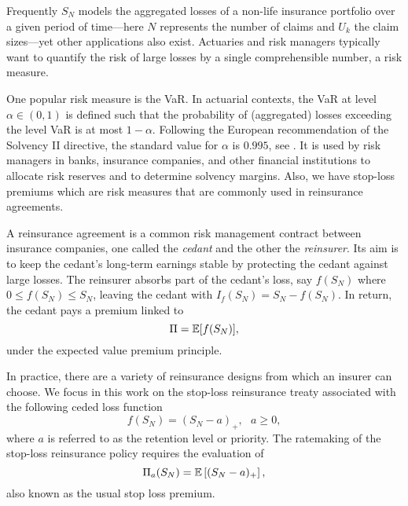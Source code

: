 Frequently $S_N$ models the aggregated losses of a non-life insurance portfolio over a given period of time---here $N$ represents the number of claims and $U_k$ the claim sizes---yet other applications also exist. Actuaries and risk managers typically want to quantify the risk of large losses by a single comprehensible number, a risk measure.

One popular risk measure is the VaR. In actuarial contexts, the VaR at level $\alpha \in (0,1)$ is defined such that the probability of (aggregated) losses exceeding the level VaR is at most $1-\alpha$.
Following the European recommendation of the Solvency II directive, the standard value for $\alpha$ is $0.995$, see \cite{EIOPA}. It is used by risk managers in banks, insurance companies, and other financial institutions to allocate risk reserves and to determine solvency margins. Also, we have stop-loss premiums which are risk measures that are commonly used in reinsurance agreements.


A reinsurance agreement is a common risk management contract between insurance companies, one called the \emph{cedant} and the other the \emph{reinsurer}. Its aim is to keep the cedant's long-term earnings stable by protecting the cedant against large losses. The reinsurer absorbs part of the cedant's loss, say $f(S_N)$ where $0\leq f(S_N)\leq S_N$, leaving the cedant with $I_{f}(S_N)=S_N-f(S_N)$. In return, the cedant pays a premium linked to
\begin{equation*}\label{eq:DefinitionReinsurancePremium}
\Pi=\operatorname{{\mathbb E}}[f(S_N)],
\end{equation*}
under the expected value premium principle.


In practice, there are a variety of reinsurance designs from which an insurer can choose. We focus in this work on the stop-loss reinsurance treaty associated with the following ceded loss function
\begin{equation*}\label{eq:StopLossCededFunction}
f(S_N)=(S_N-a)_{+},\text{ }a\geq0,
\end{equation*}
where $a$ is referred to as the retention level or priority. The ratemaking of the stop-loss reinsurance policy requires the evaluation of
\begin{equation}\label{eq:DefUsualStopLossPremium}
\Pi_{a}(S_N)=\operatorname{{\mathbb E}}\left[(S_N-a)_{+}\right],
\end{equation}
also known as the usual stop loss premium.

